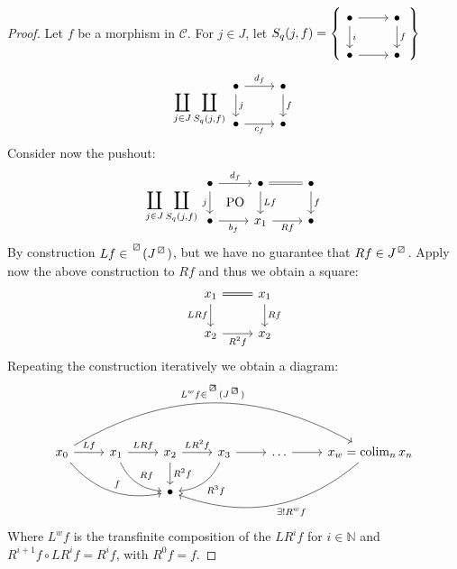 \begin{proof}
    Let $f$ be a morphism in $\mathcal{C}$.
    For $j \in J$, let $S_q(j,f)=
    \left\{ 
        \begin{tikzcd}
        \bullet
        \ar[d, "i"]
        \ar[r]
        &
        \bullet
        \ar[d, "f"]
        \\
        \bullet 
        \ar[r]
        &
        \bullet
        \end{tikzcd}
    \right\}$
    \[
    \coprod_{j\in J}\coprod_{S_q(j,f)}
    \begin{tikzcd}
        \bullet
        \ar[d, "j"]
        \ar[r, "d_f"]
        &
        \bullet
        \ar[d, "f"]
        \\
        \bullet 
        \ar[r, "c_f"']
        &
        \bullet
    \end{tikzcd}
    \]
    Consider now the pushout:
    \[
    \coprod_{j\in J}\coprod_{S_q(j,f)}
    \begin{tikzcd}
        \bullet
        \ar[r, "d_f"]
        \ar[d, "j"']
        \ar[r, phantom, shift right =3.4ex, "\PO" ]
        &
        \bullet
        \ar[d, "Lf"]
        \ar[r, equal]
        &
        \bullet
        \ar[d, "f"]
        \\
        \bullet
        \ar[r,"b_f"']
        &
        x_1 
        \ar[r, "Rf"']
        &
        \bullet
    \end{tikzcd}
    \]
    By construction $Lf \in \prescript{\lift{}}{}{(J^{\lift{}})}$, but we have no guarantee that $Rf \in J^{\lift{}}$.
    Apply now the above construction to $Rf$ and thus we obtain a square:
    \[
    \begin{tikzcd}
        x_1 
        \ar[r, equal]
        \ar[d, "LRf"']
        &
        x_1
        \ar[d, "Rf"]
        \\
        x_2
        \ar[r, "R^2f"']
        &
        x_2
    \end{tikzcd}
    \]
    Repeating the construction iteratively we obtain a diagram:
    \[
    \begin{tikzcd}
        x_0
        \ar[r, "Lf"]
        \ar[rrd, bend right, "f"]
        \ar[rrrrr, bend left, "{L^wf \in \prescript{\lift{}}{}{(J^{\lift{}})}}" ]
        &
        x_1
        \ar[r,"LRf"]
        \ar[rd, bend right, "Rf"]
        &
        x_2
        \ar[r, "LR^2f"]
        \dar["R^2f"]
        &
        x_3
        \ar[r]
        \ar[ld, bend left,"R^3f"]
        &
        \dotsc 
        \rar
        &
        x_w=\colim_n x_n
        \ar[llld, bend left, "\exists ! R^wf"]
        \\
        &&
        \bullet
    \end{tikzcd}
    \]
    Where $L^wf$ is the transfinite composition of the $LR^if$ for $i \in \mathbb{N}$ and $R^{i+1}f \circ LR^if=R^if$, with $R^0f=f$.


\end{proof}
